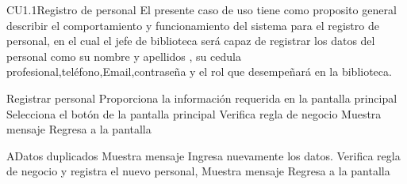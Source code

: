 \begin{UseCase}{CU1.1}{Registro de personal}{
	El presente caso de uso tiene como proposito general describir el comportamiento y funcionamiento del sistema para el registro de personal, en el cual el jefe de biblioteca será capaz de registrar los datos del personal como su nombre y apellidos , su cedula profesional,teléfono,Email,contraseña y el rol que desempeñará en la biblioteca.
}
	\end{UseCase}
	\begin{UCtrayectoria}{Registrar personal}
		\UCpaso[\UCactor] Proporciona la información requerida en la pantalla principal 
		\UCpaso[\UCactor] Selecciona el botón  de la pantalla principal 
		\UCpaso[\UCsist] Verifica regla de negocio  
		\UCpaso[\UCsist] Muestra mensaje 
		\UCpaso[\UCsist] Regresa a la pantalla 
	\end{UCtrayectoria}
	\begin{UCtrayectoriaA}{A}{Datos duplicados}
		\UCpaso[\UCsist] Muestra mensaje 
			\UCpaso[\UCactor] Ingresa nuevamente los datos.
			\UCpaso[\UCsist] Verifica regla de negocio  y registra el nuevo personal, 
		\UCpaso[\UCsist] Muestra mensaje 
		\UCpaso[\UCsist] Regresa a la pantalla 
	\end{UCtrayectoriaA}